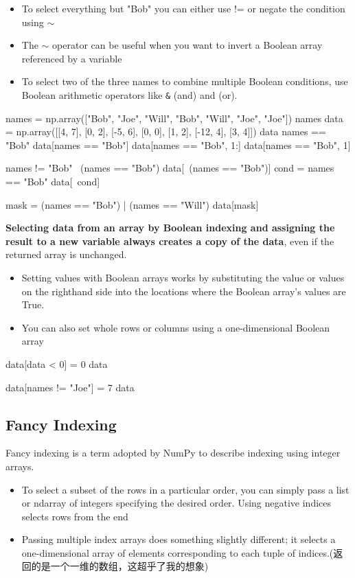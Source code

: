 \begin{itemize}
    \item To select everything but "Bob" you can either use != or negate the condition using $\sim$
    \item The $\sim$ operator can be useful when you want to invert a Boolean array referenced by a variable
    \item To select two of the three names to combine multiple Boolean conditions, use Boolean arithmetic operators like \verb|&| (and) and \textbar (or).
\end{itemize}

\begin{pyc}
names = np.array(["Bob", "Joe", "Will", "Bob", "Will", "Joe", "Joe"])
names
data = np.array([[4, 7], [0, 2], [-5, 6], [0, 0], [1, 2], [-12, 4], [3, 4]])
data
names == "Bob"
data[names == "Bob"]
data[names == "Bob", 1:]
data[names == "Bob", 1]

names != "Bob"
~(names == "Bob")
data[~(names == "Bob")]
cond = names == "Bob"
data[~cond]

mask = (names == "Bob") | (names == "Will")
data[mask]  
\end{pyc}

\textbf{Selecting data from an array by Boolean indexing and assigning the result to a new variable always creates a copy of the data}, even if the returned array is unchanged.


\begin{itemize}
    \item Setting values with Boolean arrays works by substituting the value or values on the righthand side into the locations where the Boolean array's values are True.
    \item You can also set whole rows or columns using a one-dimensional Boolean array
\end{itemize}

\begin{pyc}
data[data < 0] = 0
data

data[names != "Joe"] = 7
data
\end{pyc}
\subsection{Fancy Indexing}
Fancy indexing is a term adopted by NumPy to describe indexing using integer arrays.
\begin{itemize}
    \item To select a subset of the rows in a particular order, you can simply pass a list or
    ndarray of integers specifying the desired order. Using negative indices selects rows from
    the end
    \item Passing multiple index arrays does something slightly different; it selects a one-dimensional array of elements corresponding to each tuple of indices.(返回的是一个一维的数组，这超乎了我的想象)
\end{itemize}

